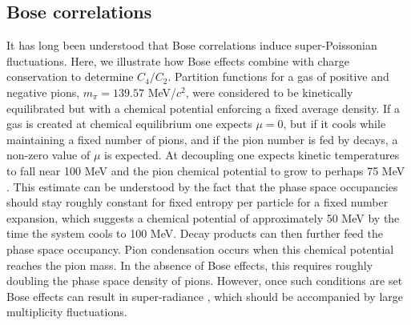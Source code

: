 \documentclass[aps,prc,nofootinbib,showpacs,superscriptaddress,groupedaddress]{revtex4-1}
\begin{document}
\subsection{Bose correlations}

It has long been understood that Bose correlations induce super-Poissonian fluctuations. Here, we illustrate how Bose effects combine with charge conservation to determine $C_4/C_2$. Partition functions for a gas of positive and negative pions, $m_\pi=139.57$ MeV/$c^2$, were considered to be kinetically equilibrated but with a chemical potential enforcing a fixed average density. If a gas is created at chemical equilibrium one expects $\mu=0$, but if it cools while maintaining a fixed number of pions, and if the pion number is fed by decays, a non-zero value of $\mu$ is expected. At decoupling one expects kinetic temperatures to fall near 100 MeV and the pion chemical potential to grow to perhaps 75 MeV \cite{Greiner:1993jn}. This estimate can be understood by the fact that the phase space occupancies should stay roughly constant for fixed entropy per particle for a fixed number expansion, which suggests a chemical potential of approximately 50 MeV by the time the system cools to 100 MeV. Decay products can then further feed the phase space occupancy. Pion condensation occurs when this chemical potential reaches the pion mass. In the absence of Bose effects, this requires roughly doubling the phase space density of pions. However, once such conditions are set Bose effects can result in super-radiance \cite{}, which should be accompanied by large multiplicity fluctuations. 
\end{document}
